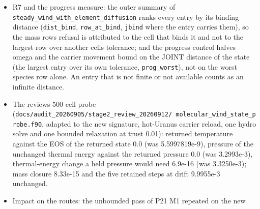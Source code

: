 \documentclass[english,a4paper]{my_memo}
\begin{document}
\begin{itemize}
\begin{itemize}
    consistency rows are absolute: the returned pressure is that of the
    unchanged thermal energy (0.0), the returned temperature is that of the
    returned composition (0.0), the background third-body density and
    temperature the sweep stored are those of the returned composition
    (6.53e-7 and 2.28e-7 relative, allowance 10 \texttt{ieq\_res\_tol}), and one
    further sweep leaves the returned composition within the sweep tolerance
    (8.83e-7 against \texttt{ieq\_res\_tol}). Nine rows for R1: a rejected trial keeps
    the history certifiable, keeps no step, hands back the entry composition
    bit for bit and names the refused interval; a pass after the refusals
    keeps a step and stays eligible; a refused trial in phys mode reports
    exhausted, leaves the history certifiable and writes no composition.
    RED on the entry text (the trial marking the history, the refresh not
    closed): five rows fail (pressure 1.2e-7, temperature 3.5e-7, further
    sweep 1.2e-6, the two R1 rows 0 of 1); GREEN on the tree: 138 PASS, 0
    FAIL.
  \item
    R7 and the progress measure: the outer summary of
    \texttt{steady\_wind\_with\_element\_diffusion} ranks every entry by its binding
    distance (\texttt{dist\_bind}, \texttt{row\_at\_bind}, \texttt{jbind} where the entry carries
    them), so the mass row\textquotesingle s refusal is attributed to the cell that binds it
    and not to the largest row over another cell\textquotesingle s tolerance; and the
    progress control halves omega and the carrier movement bound on the
    JOINT distance of the state (the largest entry over its own tolerance,
    \texttt{prog\_worst}), not on the worst species row alone. An entry that is not
    finite or not available counts as an infinite distance.
  \item
    The review\textquotesingle s 500-cell probe (\texttt{docs/audit\_20260905/stage2\_review\_20260912/\ molecular\_wind\_state\_probe.f90}, adapted to the new signature, hot-Uranus
    carrier reload, one hydro solve and one bounded relaxation at trust
    0.01): returned temperature against the EOS of the returned state 0.0
    (was 5.5997819e-9), pressure of the unchanged thermal energy against the
    returned pressure 0.0 (was 3.2993e-3), thermal-energy change a held
    pressure would need 6.9e-16 (was 3.3250e-3); mass closure 8.33e-15 and
    the five retained steps at drift 9.9955e-3 unchanged.
  \item
    Impact on the routes: the unbounded pass of P21 M1 repeated on the new

\end{itemize}
\end{itemize}
\end{document}
